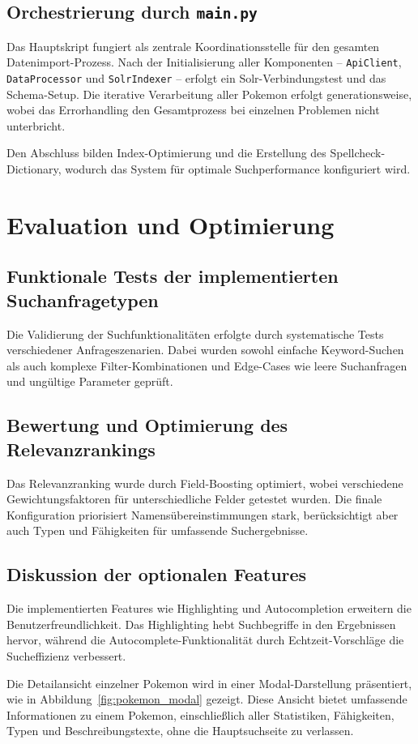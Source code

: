 \subsection{Orchestrierung durch \texttt{main.py}}

Das Hauptskript fungiert als zentrale Koordinationsstelle für den gesamten Datenimport-Prozess. Nach der Initialisierung aller Komponenten -- \texttt{ApiClient}, \texttt{DataProcessor} und \texttt{SolrIndexer} -- erfolgt ein Solr-Verbindungstest und das Schema-Setup. Die iterative Verarbeitung aller Pokemon erfolgt generationsweise, wobei das Errorhandling den Gesamtprozess bei einzelnen Problemen nicht unterbricht.

Den Abschluss bilden Index-Optimierung und die Erstellung des Spellcheck-Dictionary, wodurch das System für optimale Suchperformance konfiguriert wird.

\section{Evaluation und Optimierung}

\subsection{Funktionale Tests der implementierten Suchanfragetypen}

Die Validierung der Suchfunktionalitäten erfolgte durch systematische Tests verschiedener Anfrageszenarien. Dabei wurden sowohl einfache Keyword-Suchen als auch komplexe Filter-Kombinationen und Edge-Cases wie leere Suchanfragen und ungültige Parameter geprüft.

\subsection{Bewertung und Optimierung des Relevanzrankings}

Das Relevanzranking wurde durch Field-Boosting optimiert, wobei verschiedene Gewichtungsfaktoren für unterschiedliche Felder getestet wurden. Die finale Konfiguration priorisiert Namensübereinstimmungen stark, berücksichtigt aber auch Typen und Fähigkeiten für umfassende Suchergebnisse.

\subsection{Diskussion der optionalen Features}

Die implementierten Features wie Highlighting und Autocompletion erweitern die Benutzerfreundlichkeit. Das Highlighting hebt Suchbegriffe in den Ergebnissen hervor, während die Autocomplete-Funktionalität durch Echtzeit-Vorschläge die Sucheffizienz verbessert.

Die Detailansicht einzelner Pokemon wird in einer Modal-Darstellung präsentiert, wie in Abbildung~\ref{fig:pokemon_modal} gezeigt. Diese Ansicht bietet umfassende Informationen zu einem Pokemon, einschließlich aller Statistiken, Fähigkeiten, Typen und Beschreibungstexte, ohne die Hauptsuchseite zu verlassen.